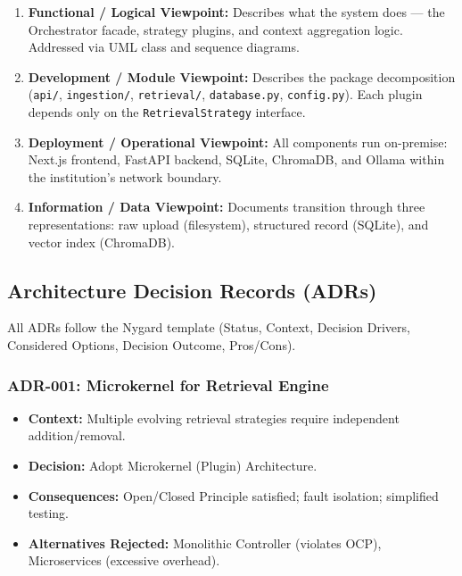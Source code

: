 \documentclass[11pt,a4paper]{article}
\begin{document}
\begin{enumerate}
    \item \textbf{Functional / Logical Viewpoint:} Describes what the system does --- the Orchestrator facade, strategy plugins, and context aggregation logic. Addressed via UML class and sequence diagrams.
    \item \textbf{Development / Module Viewpoint:} Describes the package decomposition (\texttt{api/}, \texttt{ingestion/}, \texttt{retrieval/}, \texttt{database.py}, \texttt{config.py}). Each plugin depends only on the \texttt{RetrievalStrategy} interface.
    \item \textbf{Deployment / Operational Viewpoint:} All components run on-premise: Next.js frontend, FastAPI backend, SQLite, ChromaDB, and Ollama within the institution's network boundary.
    \item \textbf{Information / Data Viewpoint:} Documents transition through three representations: raw upload (filesystem), structured record (SQLite), and vector index (ChromaDB).
\end{enumerate}

\subsection{Architecture Decision Records (ADRs)}

All ADRs follow the Nygard template (Status, Context, Decision Drivers, Considered Options, Decision Outcome, Pros/Cons).

\subsubsection{ADR-001: Microkernel for Retrieval Engine}
\begin{itemize}[leftmargin=*]
    \item \textbf{Context:} Multiple evolving retrieval strategies require independent addition/removal.
    \item \textbf{Decision:} Adopt Microkernel (Plugin) Architecture.
    \item \textbf{Consequences:} Open/Closed Principle satisfied; fault isolation; simplified testing.
    \item \textbf{Alternatives Rejected:} Monolithic Controller (violates OCP), Microservices (excessive overhead).
\end{itemize}
\end{document}
